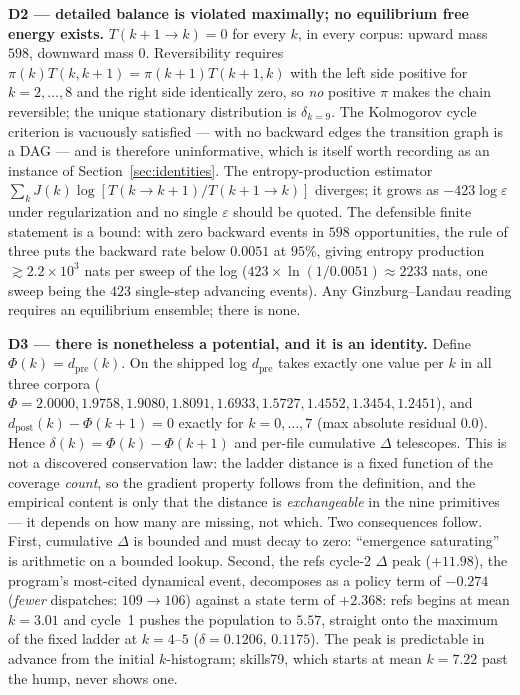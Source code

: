 \documentclass[11pt,a4paper]{article}
\theoremstyle{plain}
\theoremstyle{remark}
\theoremstyle{plain}
\begin{document}
\textbf{D2 --- detailed balance is violated maximally; no equilibrium free energy
exists.} $T(k{+}1\to k)=0$ for every $k$, in every corpus: upward mass $598$,
downward mass $0$. Reversibility requires $\pi(k)T(k,k{+}1)=\pi(k{+}1)T(k{+}1,k)$
with the left side positive for $k=2,\dots,8$ and the right side identically zero,
so \emph{no} positive $\pi$ makes the chain reversible; the unique stationary
distribution is $\delta_{k=9}$. The Kolmogorov cycle criterion is vacuously
satisfied --- with no backward edges the transition graph is a DAG --- and is
therefore uninformative, which is itself worth recording as an instance of
Section~\ref{sec:identities}. The entropy-production estimator
$\sum_kJ(k)\log[T(k\!\to\!k{+}1)/T(k{+}1\!\to\!k)]$ diverges; it grows as
$-423\log\varepsilon$ under regularization and no single $\varepsilon$ should be
quoted. The defensible finite statement is a bound: with zero backward events in
$598$ opportunities, the rule of three puts the backward rate below $0.0051$ at $95\%$, giving entropy production $\gtrsim 2.2\times10^{3}$ nats per sweep of the log ($423\times\ln(1/0.0051)\approx2233$ nats, one sweep being the $423$ single-step advancing events). Any Ginzburg--Landau reading requires an equilibrium ensemble; there is none.

\textbf{D3 --- there is nonetheless a potential, and it is an identity.} Define
$\Phi(k)=d_\mathrm{pre}(k)$. On the shipped log $d_\mathrm{pre}$ takes exactly one value
per $k$ in all three corpora ($\Phi=2.0000,1.9758,1.9080,1.8091,1.6933,1.5727,
1.4552,1.3454,1.2451$), and $d_\mathrm{post}(k)-\Phi(k{+}1)=0$ exactly for
$k=0,\dots,7$ (max absolute residual $0.0$). Hence $\delta(k)=\Phi(k)-\Phi(k{+}1)$
and per-file cumulative $\Delta$ telescopes. This is not a discovered conservation
law: the ladder distance is a fixed function of the coverage \emph{count}, so the
gradient property follows from the definition, and the empirical content is only
that the distance is \emph{exchangeable} in the nine primitives --- it depends on
how many are missing, not which. Two consequences follow. First, cumulative
$\Delta$ is bounded and must decay to zero: ``emergence saturating'' is arithmetic
on a bounded lookup. Second, the refs cycle-2 $\Delta$ peak ($+11.98$), the
program's most-cited dynamical event, decomposes as a policy term of $-0.274$
(\emph{fewer} dispatches: $109\to106$) against a state term of $+2.368$: refs
begins at mean $k=3.01$ and cycle~1 pushes the population to $5.57$, straight onto
the maximum of the fixed ladder at $k=4$--$5$ ($\delta=0.1206,\,0.1175$).
The peak is predictable in advance from the initial $k$-histogram; skills79, which
starts at mean $k=7.22$ past the hump, never shows one.
\end{document}
